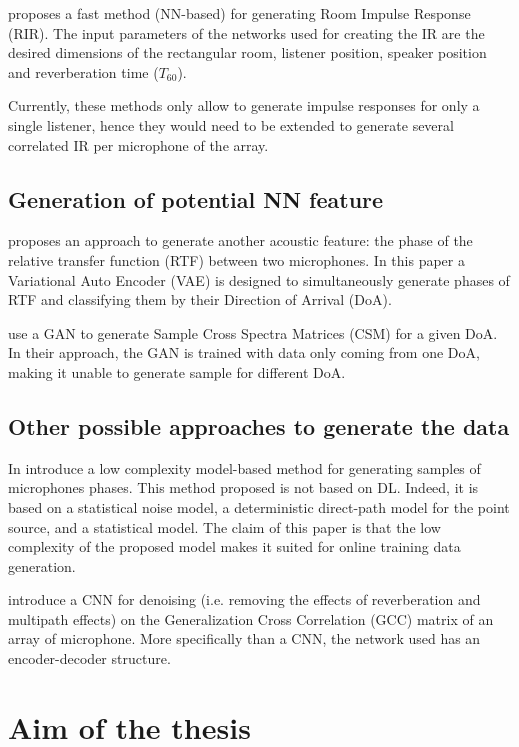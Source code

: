\documentclass[11pt,a4paper,twoside]{report}
\begin{document}
\cite{ratnarajah2021fast} proposes a fast method (NN-based) for generating Room Impulse Response (RIR). The input parameters of the networks used for creating the IR are the desired dimensions of the rectangular room, listener position, speaker position and reverberation time ($T_{60}$).

Currently, these methods only allow to generate impulse responses for only a single listener, hence they would need to be extended to generate several correlated IR per microphone of the array.

\subsection{Generation of potential NN feature}

\cite{bianco2020semi} proposes an approach to generate another acoustic feature: the phase of the relative transfer function (RTF) between two microphones. In this paper a Variational Auto Encoder (VAE) is designed to simultaneously generate phases of RTF and classifying them by their Direction of Arrival (DoA).

\cite{gerstoft2020parametric} use a GAN to generate Sample Cross Spectra Matrices (CSM) for a given DoA. In their approach, the GAN is trained with data only coming from one DoA, making it unable to generate sample for different DoA.

\subsection{Other possible approaches to generate the data}

In \cite{hubner2021efficient} introduce a low complexity model-based method for generating samples of microphones phases. This method proposed is not based on DL. Indeed, it is based on a statistical noise model, a deterministic direct-path model for the point source, and a statistical model. The claim of this paper is that the low complexity of the proposed  model makes it suited for online training data generation. 

\cite{vera2021acoustic} introduce a CNN for denoising (i.e. removing the effects of reverberation and multipath effects) on the Generalization Cross Correlation (GCC) matrix of an array of microphone. More specifically than a CNN, the network used has an encoder-decoder structure.

\section{Aim of the thesis}
\end{document}
